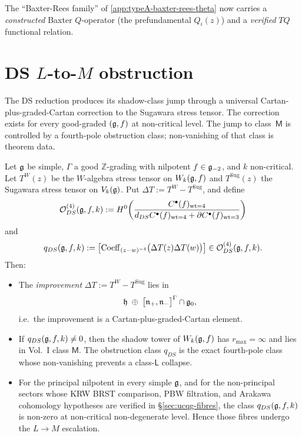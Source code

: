 The ``Baxter-Rees family'' of
\cref{app:typeA-baxter-rees-theta} now carries a
\emph{constructed} Baxter $Q$-operator (the prefundamental
$Q_i(z)$) and a \emph{verified} $TQ$ functional relation.

\section{DS $L$-to-$M$ obstruction}
\label{sec:DS-L-to-M}

The DS reduction produces its shadow-class jump through a universal
Cartan-plus-graded-Cartan correction to the Sugawara stress tensor.
The correction exists for every good-graded $(\mathfrak{g},f)$ at non-critical
level. The jump to class~$\mathsf M$ is controlled by a fourth-pole
obstruction class; non-vanishing of that class is theorem data.

\begin{theorem}
\label{thm:DS-L-to-M-universal}
\ClaimStatusProvedHere
Let $\mathfrak{g}$ be simple, $\Gamma$ a good $\mathbb{Z}$-grading with
nilpotent $f\in\mathfrak{g}_{-2}$, and $k$ non-critical. Let $T^{W}(z)$ be the
$W$-algebra stress tensor on $W_k(\mathfrak{g}, f)$ and $T^{\mathrm{Sug}}(z)$
the Sugawara stress tensor on $V_k(\mathfrak{g})$. Put
$\Delta T:=T^W-T^{\mathrm{Sug}}$, and define
\[
 \mathcal O^{(4)}_{DS}(\mathfrak{g},f,k)
 :=
 H^0\!\left(
 \frac{C^\bullet(f)_{\mathrm{wt}=4}}
 {d_{DS}C^\bullet(f)_{\mathrm{wt}=4}
  +\partial C^\bullet(f)_{\mathrm{wt}=3}}
 \right)
\]
and
\[
 q_{DS}(\mathfrak{g},f,k)
 :=
 \left[\operatorname{Coeff}_{(z-w)^{-4}}
 \bigl(\Delta T(z)\Delta T(w)\bigr)\right]
 \in \mathcal O^{(4)}_{DS}(\mathfrak{g},f,k).
\]
Then:
\begin{itemize}
\item[(a)] The \emph{improvement} $\Delta T := T^{W} - T^{\mathrm{Sug}}$ lies in
\[
 \mathfrak{h} \;\oplus\; \bigl[\mathfrak{n}_{+}, \mathfrak{n}_{-}\bigr]^{\Gamma}\cap \mathfrak{g}_0,
\]
i.e.\ the improvement is a Cartan-plus-graded-Cartan element.

\item[(b)] If $q_{DS}(\mathfrak{g},f,k)\neq 0$, then the shadow tower of
$W_k(\mathfrak{g}, f)$ has $r_{\max}=\infty$ and lies in Vol.~I class
$\mathsf M$. The obstruction class $q_{DS}$ is the exact fourth-pole
class whose non-vanishing prevents a class-$\mathsf L$ collapse.

\item[(c)] For the principal nilpotent in every simple $\mathfrak{g}$, and for
the non-principal sectors whose KRW BRST comparison, PBW filtration,
and Arakawa cohomology hypotheses are verified in
\S\ref{sec:ucqg-fibres}, the class $q_{DS}(\mathfrak{g},f,k)$ is non-zero at
non-critical non-degenerate level. Hence those fibres undergo the
$L\to M$ escalation.
\end{itemize}
\end{theorem}


